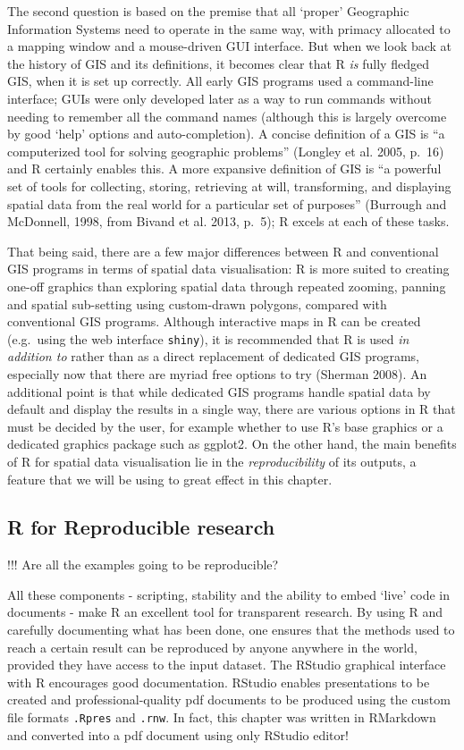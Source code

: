\documentclass[]{article}
\begin{document}
The second question is based on the premise that all `proper' Geographic
Information Systems need to operate in the same way, with primacy
allocated to a mapping window and a mouse-driven GUI interface. But when
we look back at the history of GIS and its definitions, it becomes clear
that R \emph{is} fully fledged GIS, when it is set up correctly. All
early GIS programs used a command-line interface; GUIs were only
developed later as a way to run commands without needing to remember all
the command names (although this is largely overcome by good `help'
options and auto-completion). A concise definition of a GIS is ``a
computerized tool for solving geographic problems'' (Longley et al.
2005, p.~16) and R certainly enables this. A more expansive definition
of GIS is ``a powerful set of tools for collecting, storing, retrieving
at will, transforming, and displaying spatial data from the real world
for a particular set of purposes'' (Burrough and McDonnell, 1998, from
Bivand et al. 2013, p.~5); R excels at each of these tasks.

That being said, there are a few major differences between R and
conventional GIS programs in terms of spatial data visualisation: R is
more suited to creating one-off graphics than exploring spatial data
through repeated zooming, panning and spatial sub-setting using
custom-drawn polygons, compared with conventional GIS programs. Although
interactive maps in R can be created (e.g.~using the web interface
\texttt{shiny}), it is recommended that R is used \emph{in addition to}
rather than as a direct replacement of dedicated GIS programs,
especially now that there are myriad free options to try (Sherman 2008).
An additional point is that while dedicated GIS programs handle spatial
data by default and display the results in a single way, there are
various options in R that must be decided by the user, for example
whether to use R's base graphics or a dedicated graphics package such as
ggplot2. On the other hand, the main benefits of R for spatial data
visualisation lie in the \emph{reproducibility} of its outputs, a
feature that we will be using to great effect in this chapter.

\subsection{R for Reproducible research}

!!! Are all the examples going to be reproducible?

All these components - scripting, stability and the ability to embed
`live' code in documents - make R an excellent tool for transparent
research. By using R and carefully documenting what has been done, one
ensures that the methods used to reach a certain result can be
reproduced by anyone anywhere in the world, provided they have access to
the input dataset. The RStudio graphical interface with R encourages
good documentation. RStudio enables presentations to be created and
professional-quality pdf documents to be produced using the custom file
formats \texttt{.Rpres} and \texttt{.rnw}. In fact, this chapter was
written in RMarkdown and converted into a pdf document using only
RStudio editor!
\end{document}
